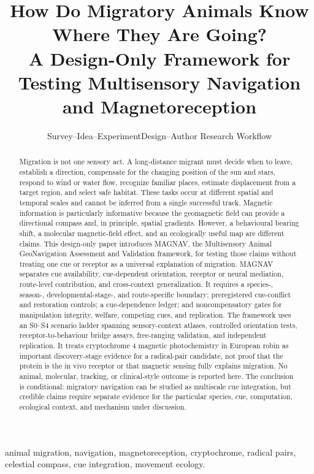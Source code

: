 \documentclass[conference]{IEEEtran}
\title{How Do Migratory Animals Know Where They Are Going?\\
A Design-Only Framework for Testing Multisensory Navigation and Magnetoreception}
\author{Survey--Idea--ExperimentDesign--Author Research Workflow}
\begin{document}
\maketitle

\begin{abstract}
Migration is not one sensory act. A long-distance migrant must decide when to leave, establish a direction, compensate for the changing position of the sun and stars, respond to wind or water flow, recognize familiar places, estimate displacement from a target region, and select safe habitat. These tasks occur at different spatial and temporal scales and cannot be inferred from a single successful track. Magnetic information is particularly informative because the geomagnetic field can provide a directional compass and, in principle, spatial gradients. However, a behavioural bearing shift, a molecular magnetic-field effect, and an ecologically useful map are different claims. This design-only paper introduces MAGNAV, the Multisensory Animal GeoNavigation Assessment and Validation framework, for testing those claims without treating one cue or receptor as a universal explanation of migration. MAGNAV separates cue availability, cue-dependent orientation, receptor or neural mediation, route-level contribution, and cross-context generalization. It requires a species-, season-, developmental-stage-, and route-specific boundary; preregistered cue-conflict and restoration controls; a cue-dependence ledger; and noncompensatory gates for manipulation integrity, welfare, competing cues, and replication. The framework uses an S0--S4 scenario ladder spanning sensory-context atlases, controlled orientation tests, receptor-to-behaviour bridge assays, free-ranging validation, and independent replication. It treats cryptochrome 4 magnetic photochemistry in European robin as important discovery-stage evidence for a radical-pair candidate, not proof that the protein is the in vivo receptor or that magnetic sensing fully explains migration. No animal, molecular, tracking, or clinical-style outcome is reported here. The conclusion is conditional: migratory navigation can be studied as multiscale cue integration, but credible claims require separate evidence for the particular species, cue, computation, ecological context, and mechanism under discussion.
\end{abstract}

\begin{IEEEkeywords}
animal migration, navigation, magnetoreception, cryptochrome, radical pairs, celestial compass, cue integration, movement ecology.
\end{IEEEkeywords}
\end{document}
